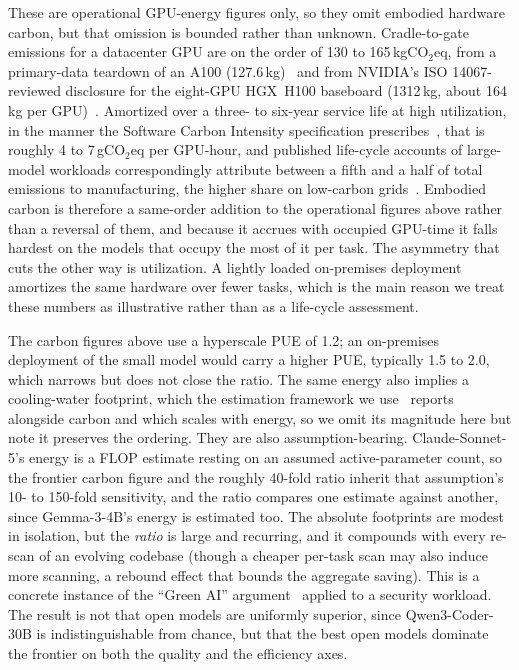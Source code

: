 \documentclass[computers,article,submit,moreauthors]{Definitions/mdpi}
\begin{document}
These are operational GPU-energy figures only, so they omit embodied hardware carbon, but that omission is bounded rather than unknown. Cradle-to-gate emissions for a datacenter GPU are on the order of 130 to 165\,kgCO$_2$eq, from a primary-data teardown of an A100 (127.6\,kg)~\citep{falk} and from NVIDIA's ISO 14067-reviewed disclosure for the eight-GPU HGX~H100 baseboard (1312\,kg, about 164\,kg per GPU)~\citep{nvidiapcf}. Amortized over a three- to six-year service life at high utilization, in the manner the Software Carbon Intensity specification prescribes~\citep{iso21031}, that is roughly 4 to 7\,gCO$_2$eq per GPU-hour, and published life-cycle accounts of large-model workloads correspondingly attribute between a fifth and a half of total emissions to manufacturing, the higher share on low-carbon grids~\citep{bloomcarbon,leobet}. Embodied carbon is therefore a same-order addition to the operational figures above rather than a reversal of them, and because it accrues with occupied GPU-time it falls hardest on the models that occupy the most of it per task. The asymmetry that cuts the other way is utilization. A lightly loaded on-premises deployment amortizes the same hardware over fewer tasks, which is the main reason we treat these numbers as illustrative rather than as a life-cycle assessment.

The carbon figures above use a hyperscale PUE of 1.2; an on-premises deployment of the small model would carry a higher PUE, typically 1.5 to 2.0, which narrows but does not close the ratio. The same energy also implies a cooling-water footprint, which the estimation framework we use~\citep{jegham} reports alongside carbon and which scales with energy, so we omit its magnitude here but note it preserves the ordering. They are also assumption-bearing. Claude-Sonnet-5's energy is a FLOP estimate resting on an assumed active-parameter count, so the frontier carbon figure and the roughly 40-fold ratio inherit that assumption's 10- to 150-fold sensitivity, and the ratio compares one estimate against another, since Gemma-3-4B's energy is estimated too. The absolute footprints are modest in isolation, but the \emph{ratio} is large and recurring, and it compounds with every re-scan of an evolving codebase (though a cheaper per-task scan may also induce more scanning, a rebound effect that bounds the aggregate saving). This is a concrete instance of the ``Green AI'' argument~\citep{greenai,helm,luccioni} applied to a security workload. The result is not that open models are uniformly superior, since Qwen3-Coder-30B is indistinguishable from chance, but that the best open models dominate the frontier on both the quality and the efficiency axes.
\end{document}
